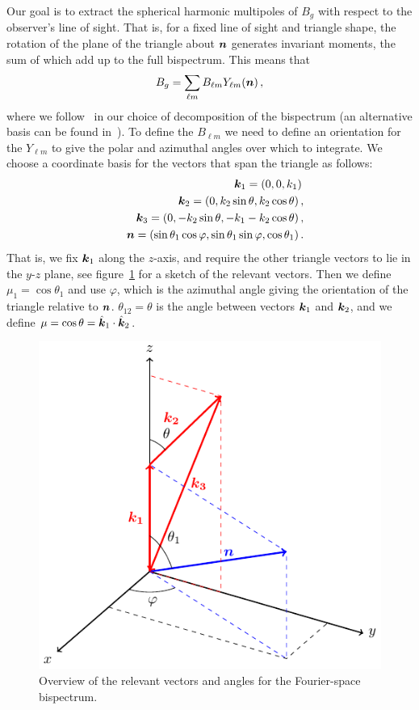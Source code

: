 Our goal is to extract the spherical harmonic multipoles of $B_g$ with respect to the observer's line of sight. That is, for a fixed line of sight and triangle shape, the rotation of the plane of the triangle about $\bm {n}$ generates invariant moments, the sum of which add up to the full bispectrum. 
 This means that  
\begin{equation}
B_g =\sum_{\ell m} B_{\ell m}Y_{\ell m}(\bm {n})\,,
\end{equation}
where we follow~\cite{Scoccimarro:1999ed,Nan:2017oaq} in our choice of decomposition of the bispectrum (an alternative basis can be found in~\cite{Sugiyama:2018yzo}).
To define the $B_{\ell m}$ we need to define an orientation for the $Y_{\ell m}$ to give the polar and azimuthal angles over which to integrate. We choose a coordinate basis for the vectors that span the triangle as follows: 
\begin{eqnarray}
	&&\bm {k}_1 = (0,0,k_1)\, \\
	&&\bm {k}_2 = (0, k_2 \sin\theta, k_2 \cos\theta)\,, \\
	&&\bm {k}_3 = (0, - k_2 \sin\theta, - k_1 - k_2\cos\theta )\,,\\
	&&\bm{n} = (\sin\theta_1 \cos\varphi, \sin\theta_1 \sin\varphi,\cos\theta_1)\,.
\end{eqnarray}
That is, we fix $\bm {k}_1$ along the $z$-axis, and require the other triangle vectors to lie in the $y$-$z$ plane, see figure~\ref{fig:geometry_overview} for a sketch of the relevant vectors. Then we define {\(\mu_1=\cos\theta_1\)} and use $\varphi$, which is the azimuthal angle giving the orientation of the triangle relative to $\bm {n}$. \(\theta_{12} = \theta\) is the angle between vectors \(\bm {k}_1\) and \(\bm {k}_2\), and we define $\mu=\cos\theta=\hat{\bm {k}}_1\cdot\hat{\bm {k}}_2$.
\begin{figure}[ht]
	\centering
	\includegraphics[width=0.6
	\linewidth]{fig/fig.pdf}
	\caption{Overview of the relevant vectors and angles for the Fourier-space bispectrum. \label{fig:geometry_overview} }
\end{figure}

